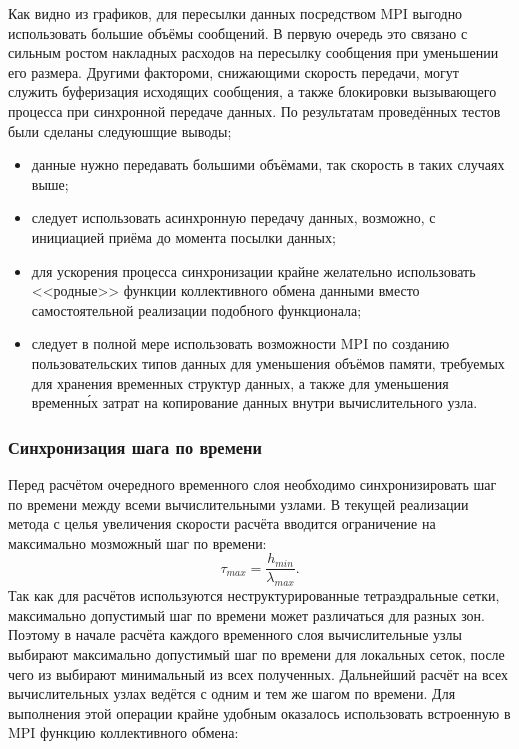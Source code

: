 Как видно из графиков, для пересылки данных посредством MPI выгодно использовать большие объёмы сообщений. В первую очередь это связано с сильным ростом накладных расходов на пересылку сообщения при уменьшении его размера. Другими фактороми, снижающими скорость передачи, могут служить буферизация исходящих сообщения, а также блокировки вызывающего процесса при синхронной передаче данных. По результатам проведённых тестов были сделаны следуюшщие выводы;
\begin{itemize}
	\item данные нужно передавать большими объёмами, так скорость в таких случаях выше;
	\item следует использовать асинхронную передачу данных, возможно, с инициацией приёма до момента посылки данных;
	\item для ускорения процесса синхронизации крайне желательно использовать <<родные>> функции коллективного обмена данными вместо самостоятельной реализации подобного функционала;
	\item следует в полной мере использовать возможности MPI по созданию пользовательских типов данных для уменьшения объёмов памяти, требуемых для хранения временных структур данных, а также для уменьшения временн\'{ы}х затрат на копирование данных внутри вычислительного узла.
\end{itemize}

\subsubsection{Синхронизация шага по времени}
Перед расчётом очередного временного слоя необходимо синхронизировать шаг по времени между всеми вычислительными узлами. В текущей реализации метода с целья увеличения скорости расчёта вводится ограничение на максимально мозможный шаг по времени:
\begin{equation}
\label{max_time_step}
\tau_{max}=\frac{h_{min}}{\lambda_{max}}.
\end{equation}
Так как для расчётов используются неструктурированные тетраэдральные сетки, максимально допустимый шаг по времени может различаться для разных зон. Поэтому в начале расчёта каждого временного слоя вычислительные узлы выбирают максимально допустимый шаг по времени для локальных сеток, после чего из выбирают минимальный из всех полученных. Дальнейший расчёт на всех вычислительных узлах ведётся с одним и тем же шагом по времени. Для выполнения этой операции крайне удобным оказалось использовать встроенную в MPI функцию коллективного обмена:
